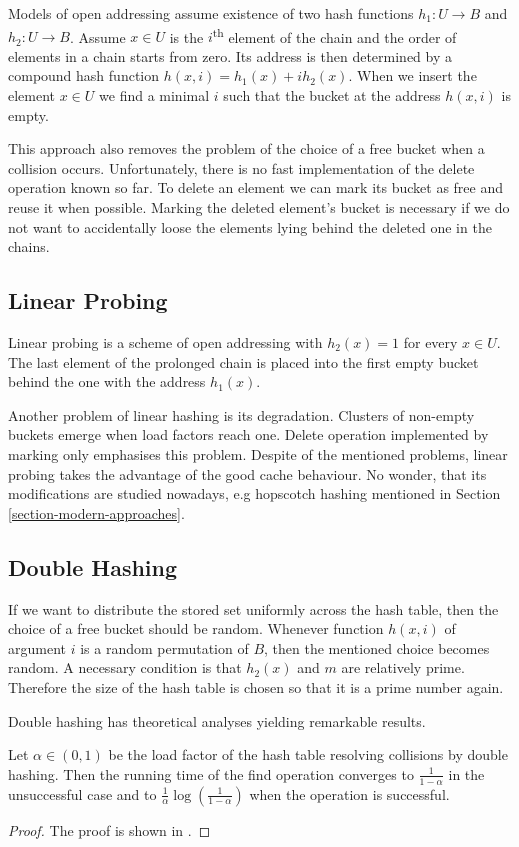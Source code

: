 Models of open addressing assume existence of two hash functions $h_1: U \rightarrow B$ and $h_2: U \rightarrow B$. Assume $x \in U$ is the $i$\textsuperscript{th} element of the chain and the order of elements in a chain starts from zero. Its address is then determined by a compound hash function $h(x, i) = h_1(x) + i h_2(x)$. When we insert the element $x \in U$ we find a minimal $i$ such that the bucket at the address $h(x, i)$ is empty.

This approach also removes the problem of the choice of a free bucket when a collision occurs. Unfortunately, there is no fast implementation of the delete operation known so far. To delete an element we can mark its bucket as free and reuse it when possible. Marking the deleted element's bucket is necessary if we do not want to accidentally loose the elements lying behind the deleted one in the chains.

\subsection{Linear Probing}
Linear probing is a scheme of open addressing with $h_2(x) = 1$ for every $x \in U$. The last element of the prolonged chain is placed into the first empty bucket behind the one with the address $h_1(x)$.

Another problem of linear hashing is its degradation. Clusters of non-empty buckets emerge when load factors reach one. Delete operation implemented by marking only emphasises this problem. Despite of the mentioned problems, linear probing takes the advantage of the good cache behaviour. No wonder, that its modifications are studied nowadays, e.g hopscotch hashing mentioned in Section \ref{section-modern-approaches}.

\subsection{Double Hashing}
If we want to distribute the stored set uniformly across the hash table, then the choice of a free bucket should be random. Whenever function $h(x, i)$ of argument $i$ is a random permutation of $B$, then the mentioned choice becomes random. A necessary condition is that $h_2(x)$ and $m$ are relatively prime. Therefore the size of the hash table is chosen so that it is a prime number again. 

Double hashing has theoretical analyses yielding remarkable results.
\begin{theorem}
Let $\alpha \in (0, 1)$ be the load factor of the hash table resolving collisions by double hashing. Then the running time of the find operation converges to $\frac{1}{1 - \alpha}$ in the unsuccessful case and to $\frac{1}{\alpha}\log\left(\frac{1}{1 - \alpha}\right)$ when the operation is successful.
\end{theorem}
\begin{proof}
The proof is shown in \cite{DBLP:books/sp/Mehlhorn84}.
\end{proof}

